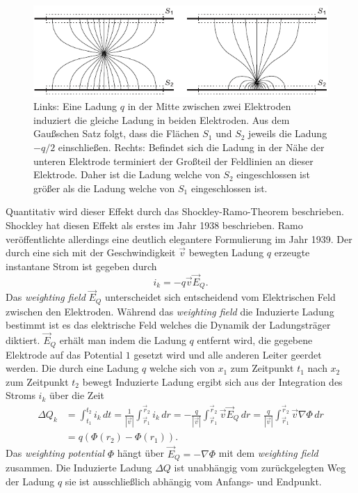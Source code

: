 \begin{figure}[!b]
\begin{center}
\includegraphics[scale=1.25]{./fig/RamoQual.pdf}
\end{center}
\vspace{-0.5cm}
\caption{Links: Eine Ladung $q$ in der Mitte zwischen zwei Elektroden induziert die gleiche Ladung in beiden Elektroden. Aus dem Gaußschen Satz folgt, dass die Flächen $S_1$ und $S_2$ jeweils die Ladung $-q/2$ einschließen. Rechts: Befindet sich die Ladung in der Nähe der unteren Elektrode terminiert der Großteil der Feldlinien an dieser Elektrode. Daher ist die Ladung welche von $S_2$ eingeschlossen ist größer als die Ladung welche von $S_1$ eingeschlossen ist. \cite{Editors}}
\label{fig:RamoQual}
\end{figure}

Quantitativ wird dieser Effekt durch das Shockley-Ramo-Theorem beschrieben.
Shockley hat diesen Effekt als erstes im Jahr 1938 beschrieben.
Ramo veröffentlichte allerdings eine deutlich elegantere Formulierung im Jahr 1939.
Der durch eine sich mit der Geschwindigkeit $\vec{v}$ bewegten Ladung $q$ erzeugte instantane Strom ist gegeben durch
\begin{equation}
i_k = -q\vec{v}\vec{E}_Q.
\label{eq:RamoCurrent}
\end{equation}
Das \textit{weighting field} $\vec{E}_Q$ unterscheidet sich entscheidend vom Elektrischen Feld zwischen den Elektroden.
Während das \textit{weighting field} die Induzierte Ladung bestimmt ist es das elektrische Feld welches die Dynamik der Ladungsträger diktiert.
$\vec{E}_Q$ erhält man indem die Ladung $q$ entfernt wird, die gegebene Elektrode auf das Potential $1$ gesetzt wird und alle anderen Leiter geerdet werden.\cite{Ramo1939}
Die durch eine Ladung $q$ welche sich von $x_1$ zum Zeitpunkt $t_1$ nach $x_2$ zum Zeitpunkt $t_2$ bewegt Induzierte Ladung ergibt sich aus der Integration des Stroms $i_k$ über die Zeit
\begin{align}
\Delta Q_k &= \int_{t_1}^{t_2}i_k \,dt = \frac{1}{|\vec{v}|} \int_{\vec{r}_1}^{\vec{r}_2}i_k \,dr = -\frac{q}{|\vec{v}|} \int_{\vec{r}_1}^{\vec{r}_2}\vec{v}\vec{E}_Q \,dr = \frac{q}{|\vec{v}|} \int_{\vec{r}_1}^{\vec{r}_2}\vec{v}\nabla\Phi \,dr \nonumber \\
&= q\left(\Phi(r_2) - \Phi(r_1)\right).
\label{eq:RamoCharge}
\end{align}
Das \textit{weighting potential} $\Phi$ hängt über $\vec{E}_Q = -\nabla\Phi$ mit dem \textit{weighting field} zusammen.
Die Induzierte Ladung $\Delta Q$ ist unabhängig vom zurückgelegten Weg der Ladung $q$ sie ist ausschließlich abhängig vom Anfangs- und Endpunkt.

